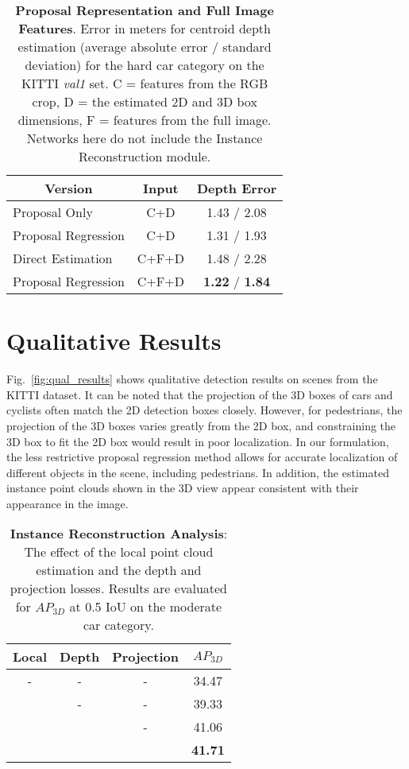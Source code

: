 \documentclass[10pt,twocolumn,letterpaper]{article}
\begin{document}
	
	\begin{table}[t]
		\small
		\centering
		\begin{tabular}{|l|c|c|}
			\hline
			\multicolumn{1}{|c|}{Version} & Input & Depth Error \\ \hline
			Proposal Only       & C+D   & 1.43 / 2.08  \\
			Proposal Regression & C+D   & 1.31 / 1.93 \\
			Direct Estimation   & C+F+D & 1.48 / 2.28 \\
			Proposal Regression & C+F+D & \textbf{1.22} / \textbf{1.84} \\
			\hline
		\end{tabular}
		\caption{\textbf{Proposal Representation and Full Image Features}. Error in meters for centroid depth estimation (average absolute error / standard deviation) for the hard car category on the KITTI \emph{val1} set. C = features from the RGB crop, D = the estimated 2D and 3D box dimensions, F = features from the full image. Networks here do not include the Instance Reconstruction module.}
		\label{tab:proposal_comparison}
	\end{table}
	
	\section{Qualitative Results}
	Fig.~\ref{fig:qual_results} shows qualitative detection results on scenes from the KITTI dataset. It can be noted that the projection of the 3D boxes of cars and cyclists often match the 2D detection boxes closely. However, for pedestrians, the projection of the 3D boxes varies greatly from the 2D box, and constraining the 3D box to fit the 2D box would result in poor localization. In our formulation, the less restrictive proposal regression method allows for accurate localization of different objects in the scene, including pedestrians. In addition, the estimated instance point clouds shown in the 3D view appear consistent with their appearance in the image.
	
	\begin{table}[t]
		\small
		\centering
		\begin{tabular}{|c|c|c||c|}
			\hline
			Local      &      Depth & Projection & $AP_{3D}$ \\
			\hline
			-          &          - &          - &     34.47 \\
			\checkmark &          - &          - &     39.33 \\
			\checkmark & \checkmark &          - &     41.06 \\
			\checkmark & \checkmark & \checkmark & \textbf{41.71} \\
			\hline
		\end{tabular}
		\caption{\textbf{Instance Reconstruction Analysis}: The effect of the local point cloud estimation and the depth and projection losses. Results are evaluated for $AP_{3D}$ at 0.5 IoU on the moderate car category.}
		\label{tab:local_global}
	\end{table}
	
\end{document}
